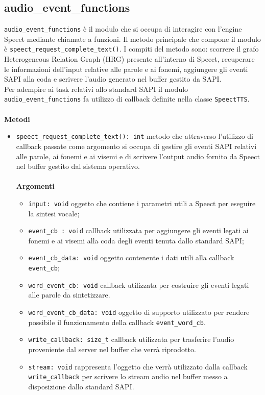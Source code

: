 \subsection{audio\_event\_functions}
\texttt{audio\_event\_functions} è il modulo che si occupa di interagire con l'engine Speect mediante chiamate a funzioni. 
Il metodo principale che compone il modulo è \texttt{speect\_request\_complete\_text()}. I compiti del metodo sono: scorrere il grafo Heterogeneous Relation Graph (HRG) presente all'interno di Speect, recuperare le informazioni dell'input relative alle parole e ai fonemi, aggiungere gli eventi SAPI alla coda e scrivere l'audio generato nel buffer gestito da SAPI.\\
Per adempire ai task relativi allo standard SAPI il modulo \texttt{audio\_event\_functions} fa utilizzo di callback definite nella classe \texttt{SpeectTTS}.
\\\\
\textbf{Metodi}
\begin{itemize}
	\item \texttt{speect\_request\_complete\_text(): int} metodo che attraverso l'utilizzo di callback passate come argomento si occupa di gestire gli eventi SAPI relativi alle parole, ai fonemi e ai visemi e di scrivere l'output audio fornito da Speect nel buffer gestito dal sistema operativo.
	\\\\
	\textbf{Argomenti}
	\begin{itemize}
		\item \texttt{input: void} oggetto che contiene i parametri utili a Speect per eseguire la sintesi vocale;
		\item \texttt{event\_cb : void} callback utilizzata per aggiungere gli eventi legati ai fonemi e ai visemi alla coda degli eventi tenuta dallo standard SAPI;
		\item \texttt{event\_cb\_data: void} oggetto contenente i dati utili alla callback \texttt{event\_cb};
		\item \texttt{word\_event\_cb: void} callback utilizzata per costruire gli eventi legati alle parole da sintetizzare.
		\item \texttt{word\_event\_cb\_data: void} oggetto di supporto utilizzato per rendere possibile il funzionamento della callback \texttt{event\_word\_cb}.
		\item \texttt{write\_callback: size\_t} callback utilizzata per trasferire l'audio proveniente dal server nel buffer che verrà riprodotto.
		\item \texttt{stream: void} rappresenta l'oggetto che verrà utilizzato dalla callback \texttt{write\_callback} per scrivere lo stream audio nel buffer messo a disposizione dallo standard SAPI.
	\end{itemize}
\end{itemize}
